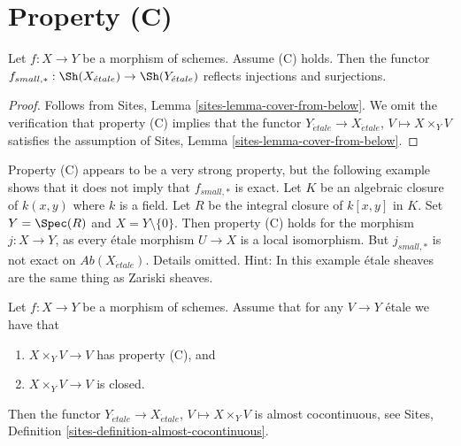 \section{Property (C)}
\label{section-C}

\begin{lemma}
\label{lemma-property-C-implies}
Let $f : X \to Y$ be a morphism of schemes. Assume (C) holds. Then the functor
$f_{small, *} :
\Sh(X_{\acute{e}tale})
\to
\Sh(Y_{\acute{e}tale})$
reflects injections and surjections.
\end{lemma}

\begin{proof}
Follows from
Sites, Lemma \ref{sites-lemma-cover-from-below}.
We omit the verification that property (C) implies that the functor
$Y_{\acute{e}tale} \to X_{\acute{e}tale}$, $V \mapsto X \times_Y V$
satisfies the assumption of
Sites, Lemma \ref{sites-lemma-cover-from-below}.
\end{proof}

\begin{remark}
\label{remark-property-C-strong}
Property (C) appears to be a very strong property, but the following
example shows that it does not imply that $f_{small, *}$ is exact.
Let $K$ be an algebraic closure of $k(x, y)$ where $k$ is a field.
Let $R$ be the integral closure of $k[x, y]$ in $K$.
Set $Y = \Spec(R)$ and $X = Y \setminus \{0\}$.
Then property (C) holds for the morphism $j : X \to Y$, as every \'etale
morphism $U \to X$ is a local isomorphism. But $j_{small, *}$ is not exact on
$\textit{Ab}(X_{\acute{e}tale})$. Details omitted. Hint: In this example \'etale
sheaves are the same thing as Zariski sheaves.
\end{remark}

\begin{lemma}
\label{lemma-property-C-closed-implies}
Let $f : X \to Y$ be a morphism of schemes. Assume that
for any $V \to Y$ \'etale we have that
\begin{enumerate}
\item $X \times_Y V \to V$ has property (C), and
\item $X \times_Y V \to V$ is closed.
\end{enumerate}
Then the functor
$Y_{\acute{e}tale} \to X_{\acute{e}tale}$, $V \mapsto X \times_Y V$
is almost cocontinuous, see
Sites, Definition \ref{sites-definition-almost-cocontinuous}.
\end{lemma}

